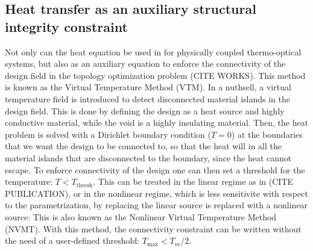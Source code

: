 
\subsection*{Heat transfer as an auxiliary structural integrity constraint}

Not only can the heat equation be used in for physically coupled thermo-optical systems,
but also as an auxiliary equation to enforce the connectivity of the design field in the 
topology optimization problem (CITE WORKS). This method is known as the Virtual Temperature
Method (VTM). In a nuthsell, a virtual temperature field is introduced to detect 
disconnected material islands in the design field. This is done by defining the design as a 
heat source and highly conductive material, while the void is a highly insulating material.
Then, the heat problem is solved with a Dirichlet boundary condition ($T = 0$) at the boundaries
that we want the design to be connected to, so that the heat will in all the
material islands that are disconnected to the boundary, since the heat cannot escape. To enforce
connectivity of the design one can then set a threshold for the temperature: $T < T_\text{thresh}$.
This can be treated in the linear regime as in (CITE PUBLICATION), or in the nonlinear regime, which
is less sensitivite with respect to the parametrization, by replacing the linear source is replaced 
with a nonlinear source:
This is also known as the Nonlinear Virtual Temperature Method (NVMT). With this method, 
the connectivity constraint can be written without the need of a user-defined threshold:
$T_\text{max} < T_m/2$.

